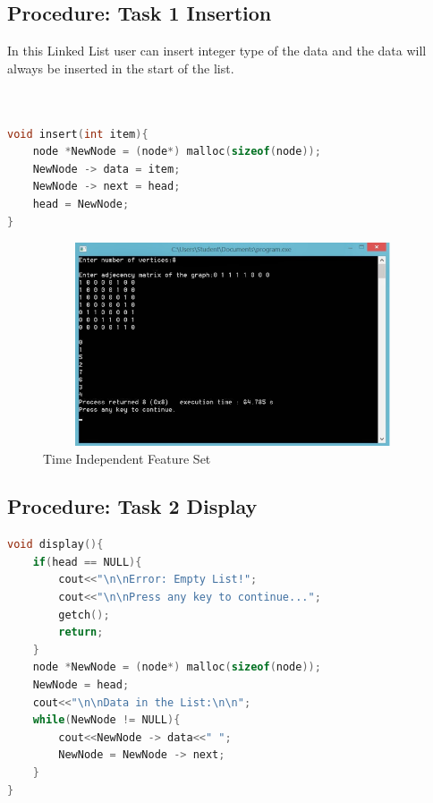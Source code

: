 \documentclass[11pt]{article}            %
\begin{document}
\subsection{Procedure: Task 1 Insertion}

In this Linked List user can insert integer type of the data and the data will always be inserted in the start of the list.  

\begin{lstlisting}[language=C++]

 
void insert(int item){
	node *NewNode = (node*) malloc(sizeof(node));
	NewNode -> data = item;
	NewNode -> next = head;
	head = NewNode;
}
\end{lstlisting}   

\begin{figure}
\centering
  \includegraphics[width=12cm,height=6cm,keepaspectratio]{1.png}
\caption{Time Independent Feature Set}
\label{Figure:3}    
\end{figure}

\subsection{Procedure: Task 2 Display}     

\begin{lstlisting}[language=C++]
void display(){
	if(head == NULL){
		cout<<"\n\nError: Empty List!";
		cout<<"\n\nPress any key to continue...";
		getch();
		return;
	}
	node *NewNode = (node*) malloc(sizeof(node));
	NewNode = head;
	cout<<"\n\nData in the List:\n\n";
	while(NewNode != NULL){
		cout<<NewNode -> data<<" ";
		NewNode = NewNode -> next;
	}
}
\end{lstlisting}
\end{document}
